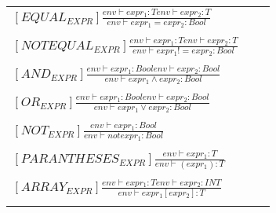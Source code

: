 \begin{table}
    \centering
    \begin{tabular}{lr>{\raggedright\arraybackslash}p{6cm}}
        $[EQUAL_{EXPR}] \frac
            {env\vdash expr_1: T env\vdash expr_2: T}
            {env\vdash expr_1 = expr_2: Bool}$
        \\
        \\
        $[NOTEQUAL_{EXPR}] \frac
            {env\vdash expr_1: T env\vdash expr_2: T}
            {env\vdash expr_1 != expr_2: Bool}$
        \\
        \\
        $[AND_{EXPR}] \frac
            {env\vdash expr_1: Bool env\vdash expr_2: Bool}
            {env\vdash expr_1 \land expr_2: Bool}$
        \\
        \\
        $[OR_{EXPR}] \frac
            {env\vdash expr_1: Bool env\vdash expr_2: Bool}
            {env\vdash expr_1 \lor expr_2: Bool}$
        \\
        \\
        $[NOT_{EXPR}] \frac
            {env\vdash expr_1: Bool}
            {env\vdash not expr_1 : Bool}$
        \\
        \\
        $[PARANTHESES_{EXPR}] \frac
            {env\vdash expr_1: T}
            {env\vdash (expr_1) : T}$
        \\
        \\
        $[ARRAY_{EXPR}] \frac
            {env\vdash expr_1: T env \vdash expr_2 : INT}
            {env\vdash expr_1[expr_2] : T}$
        \\
        \\
    \end{tabular}
\end{table}

